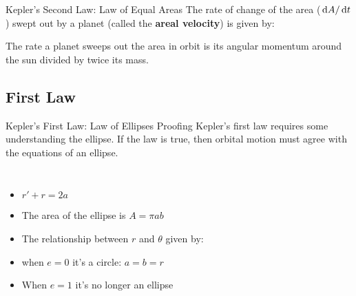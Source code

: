 \documentclass[12pt,compress,aspectratio=169]{beamer}
\begin{document}
\begin{frame}{Kepler's Second Law: Law of Equal Areas}
  The rate of change of the area ($\dl A/\dl t$) swept out by a planet (called
  the \textbf{areal velocity}) is given by:


  The rate a planet sweeps out the area in orbit is its angular momentum around
  the sun divided by twice its mass.
\end{frame}



\subsection{First Law}

\begin{frame}{Kepler's First Law: Law of Ellipses}
  Proofing Kepler's first law requires some understanding the ellipse. If
  the law is true, then orbital motion must agree with the equations of an
  ellipse.
  \begin{columns}
    \centering

    \begin{itemize}
    \item $r' + r =2a$
    \item The area of the ellipse is $A=\pi ab$
    \item The relationship between $r$ and $\theta$ given by:

    \item when $e=0$ it's a circle: $a=b=r$
    \item When $e=1$ it's no longer an ellipse
    \end{itemize}
  \end{columns}
\end{frame}
\end{document}

